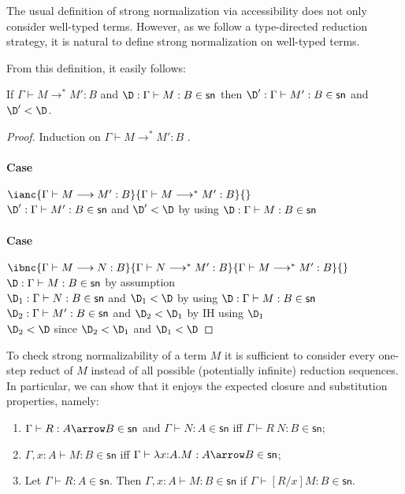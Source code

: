 \documentclass{article}
\newcommand{\csn}{\mathsf{sn}}
\newcommand{\mred}{\longrightarrow^*}
\newcommand{\red}{\longrightarrow}
\begin{document}
The usual definition of strong normalization via accessibility does not only consider well-typed terms. However, as we follow a type-directed reduction strategy, it is natural to define strong normalization on well-typed terms.

From this definition, it easily follows:

 \begin{lemma}\label{lm:mredsn}
If  $\Gamma \vdash M \mred M' : B$ and
   $\D:\Gamma \vdash M : B \in \csn$ then $\D':\Gamma \vdash M' : B \in \csn$ and $\D' < \D$.
 \end{lemma}
 \begin{proof}
Induction on $\Gamma \vdash M\mred M' : B$ .

\paragraph{Case} $\ianc{\Gamma \vdash M \red M' : B}{\Gamma \vdash M \mred M' : B}{} \qquad$
\\[1em]
$\D' : \Gamma \vdash M' : B \in \csn$ and $\D' < \D$ \hfill by using $\D:\Gamma \vdash M : B \in \csn$

\paragraph{Case} $ \ibnc{\Gamma \vdash M \red N : B}{\Gamma \vdash N \mred M' : B}
      {\Gamma \vdash M \mred M' : B}{}$
\\[1em]
$\D : \Gamma \vdash M : B \in \csn$ \hfill by assumption\\
$\D_1 : \Gamma \vdash N : B \in \csn$ and $\D_1 < \D$ \hfill by using $\D: \Gamma \vdash M : B \in \csn$\\
$\D_2 : \Gamma \vdash M' : B \in \csn$ and $\D_2 < \D_1$ \hfill by IH using $\D_1$ \\
$\D_2 < \D$ \hfill since $\D_2 < \D_1$ and $\D_1 < \D$

 \end{proof}

To check strong normalizability of a term $M$ it is sufficient to consider every one-step
reduct of $M$ instead of all possible (potentially infinite) reduction sequences. In particular, we can show that it enjoys the expected closure and substitution properties, namely:
\begin{enumerate}
\item $\Gamma \vdash R : A \arrow B \in \csn$ and $\Gamma \vdash N : A \in \csn$
    iff $\Gamma \vdash R~N : B \in \csn$;
  \item $\Gamma, x{:}A \vdash M : B \in \csn$ iff $\Gamma \vdash  \lambda x{:}A.M : A \arrow B \in \csn$;
  \item Let  $\Gamma \vdash R : A \in
   \csn$. Then $\Gamma, x{:}A \vdash M : B \in \csn$ if $\Gamma \vdash [R/x]M : B \in \csn$.
\end{enumerate}
\end{document}
